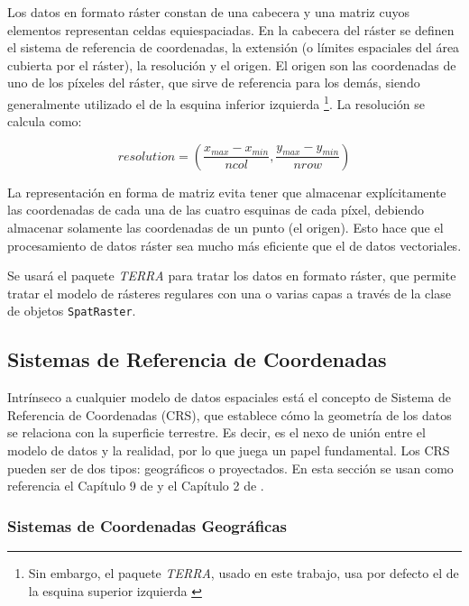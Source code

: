 \documentclass[12pt,a4paper,]{book}
\let\rmarkdownfootnote\footnote%
\def\footnote{\protect\rmarkdownfootnote}
\numberwithin{dummy}{section}
\theoremstyle{ocrenumbox}
\theoremstyle{blacknumex}
\theoremstyle{blacknumbox}
\theoremstyle{ocrenum}
\theoremstyle{ocrenum}
\begin{document}
Los datos en formato ráster constan de una cabecera y una matriz cuyos
elementos representan celdas equiespaciadas. En la cabecera del ráster
se definen el sistema de referencia de coordenadas, la extensión (o
límites espaciales del área cubierta por el ráster), la resolución y el
origen. El origen son las coordenadas de uno de los píxeles del ráster,
que sirve de referencia para los demás, siendo generalmente utilizado el
de la esquina inferior izquierda \footnote{Sin embargo, el paquete
  \emph{TERRA}, usado en este trabajo, usa por defecto el de la esquina
  superior izquierda \citep{terrapackage}}. La resolución se calcula
como:

\[ resolution = \left(\frac{x_{max}-x_{min}}{ncol},\frac{y_{max}-y_{min}}{nrow}\right) \]

La representación en forma de matriz evita tener que almacenar
explícitamente las coordenadas de cada una de las cuatro esquinas de
cada píxel, debiendo almacenar solamente las coordenadas de un punto (el
origen). Esto hace que el procesamiento de datos ráster sea mucho más
eficiente que el de datos vectoriales.

Se usará el paquete \emph{TERRA} para tratar los datos en formato
ráster, que permite tratar el modelo de rásteres regulares con una o
varias capas a través de la clase de objetos \texttt{SpatRaster}.

\hypertarget{sistemas-de-referencia-de-coordenadas}{%
\subsection{Sistemas de Referencia de
Coordenadas}\label{sistemas-de-referencia-de-coordenadas}}

Intrínseco a cualquier modelo de datos espaciales está el concepto de
Sistema de Referencia de Coordenadas (CRS), que establece cómo la
geometría de los datos se relaciona con la superficie terrestre. Es
decir, es el nexo de unión entre el modelo de datos y la realidad, por
lo que juega un papel fundamental. Los CRS pueden ser de dos tipos:
geográficos o proyectados. En esta sección se usan como referencia el
Capítulo 9 de \citet{introGISGimond} y el Capítulo 2 de
\citet{lovelace_geocomputation_2019}.

\hypertarget{sistemas-de-coordenadas-geogruxe1ficas}{%
\subsubsection*{Sistemas de Coordenadas
Geográficas}\label{sistemas-de-coordenadas-geogruxe1ficas}}
\end{document}
